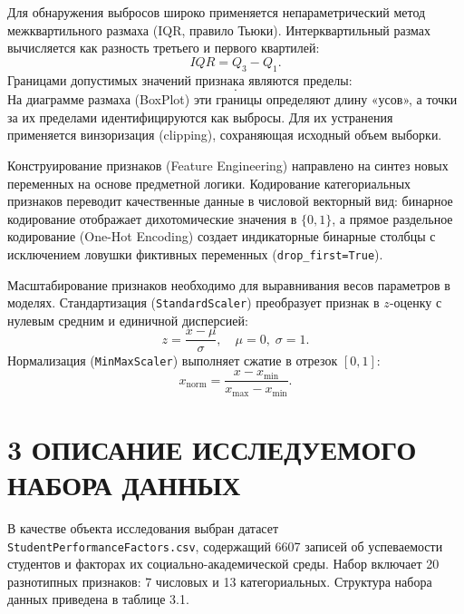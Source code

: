 \documentclass[14pt,a4paper]{extarticle}
\begin{document}
Для обнаружения выбросов широко применяется непараметрический метод межквартильного размаха (IQR, правило Тьюки). Интерквартильный размах вычисляется как разность третьего и первого квартилей:
\begin{equation}
IQR = Q_3 - Q_1.
\end{equation}
Границами допустимых значений признака являются пределы:
\begin{equation}
[Q_1 - 1.5 \cdot IQR, \; Q_3 + 1.5 \cdot IQR].
\end{equation}
На диаграмме размаха (BoxPlot) эти границы определяют длину «усов», а точки за их пределами идентифицируются как выбросы. Для их устранения применяется винзоризация (clipping), сохраняющая исходный объем выборки.

Конструирование признаков (Feature Engineering) направлено на синтез новых переменных на основе предметной логики. Кодирование категориальных признаков переводит качественные данные в числовой векторный вид: бинарное кодирование отображает дихотомические значения в $\{0, 1\}$, а прямое раздельное кодирование (One-Hot Encoding) создает индикаторные бинарные столбцы с исключением ловушки фиктивных переменных (\texttt{drop\_first=True}).

Масштабирование признаков необходимо для выравнивания весов параметров в моделях. Стандартизация (\texttt{StandardScaler}) преобразует признак в $z$-оценку с нулевым средним и единичной дисперсией:
\begin{equation}
z = \frac{x - \mu}{\sigma}, \quad \mu = 0, \; \sigma = 1.
\end{equation}
Нормализация (\texttt{MinMaxScaler}) выполняет сжатие в отрезок $[0, 1]$:
\begin{equation}
x_{\text{norm}} = \frac{x - x_{\min}}{x_{\max} - x_{\min}}.
\end{equation}

\section*{3 ОПИСАНИЕ ИССЛЕДУЕМОГО НАБОРА ДАННЫХ}

В качестве объекта исследования выбран датасет \texttt{StudentPerformanceFactors.csv}, содержащий 6607 записей об успеваемости студентов и факторах их социально-академической среды. Набор включает 20 разнотипных признаков: 7 числовых и 13 категориальных. Структура набора данных приведена в таблице 3.1.
\end{document}
